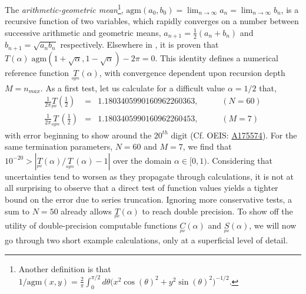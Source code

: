 \documentclass[nofootinbib,preprint]{revtex4-1}
\begin{document}
The \textit{arithmetic-geometric mean}\footnote{Another 
definition is that $1/\text{agm}(x,y) = \frac{2}{\pi} \int_{0}^{\pi/2}
d\theta\big(x^2 \cos(\theta)^2+y^2 \sin(\theta)^2\big)^{-1/2}$. }, 
$\text{agm}(a_0,b_0)=\lim_{n\rightarrow \infty}a_n =\lim_{n\rightarrow \infty}b_n$,
is a recursive function of two variables, which rapidly converges on a number between 
successive arithmetic and geometric means, $a_{n+1}=\tfrac{1}{2}(a_{n}+b_{n})$ and 
$b_{n+1}=\sqrt{a_{n} b_{n}}$ respectively. Elsewhere in \cite{AB2016}, it is proven that 
$T(\alpha)\;\text{agm}(1+\sqrt{\alpha},1-\sqrt{\alpha})-2\pi=0$. This 
identity defines a numerical reference function $\underset{^{agm}}{T}(\alpha)$, with 
convergence dependent upon recursion depth $M=n_{max}$. As a first test, let us 
calculate for a difficult value $\alpha=1/2$ that,
\begin{eqnarray}
\tfrac{1}{2\pi}\underset{^{pw}}{T}(\tfrac{1}{2}) &=& 1.1803405990160962260363,  \;\;\;\;\;\;\;\;\;\; (N=60)    \nonumber \\
\tfrac{1}{2\pi}\underset{^{agm}}{T}(\tfrac{1}{2}) &=& 1.1803405990160962260453, \;\;\;\;\;\;\;\;\;\; (M=7)    \nonumber 
\end{eqnarray}
with error beginning to show around the $20^{th}$ digit (Cf. OEIS: 
\href{https://oeis.org/A175574}{A175574}). For the same termination parameters,
$N=60$ and $M=7$, we find that 
$10^{-20} > |\underset{^{pw}}{T}(\alpha)/\underset{^{agm}}{T}(\alpha)-1|$
over the domain $\alpha \in [0,1)$. Considering that uncertainties tend to 
worsen as they propagate through calculations, it is not at all surprising to 
observe that a direct test of function values yields a tighter bound on the 
error due to series truncation. Ignoring more conservative tests, a 
sum to $N=50$ already allows $\underset{^{pw}}{T}(\alpha)$ to reach double 
precision. To show off the utility of double-precision computable functions 
$\underset{^{pw}}{C}(\alpha)$ and $\underset{^{pw}}{S}(\alpha)$, we
will now go through two short example calculations, only at a superficial 
level of detail. 
\end{document}
